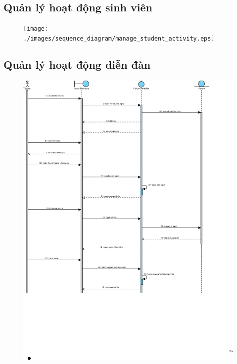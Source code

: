 \documentclass[./../main_file.tex]{subfiles}
\begin{document}
	\subsection{Quản lý hoạt động sinh viên }
	\begin{figure}[H]
		\centering
		\texttt{[image: ./images/sequence\_diagram/manage\_student\_activity.eps]}
	\end{figure}
	
	\subsection{Quản lý hoạt động diễn đàn}
	\begin{figure}[H]
		\centering
		\includegraphics[width=\linewidth]{./images/sequence_diagram/3_12_manage_forum.eps}
	\end{figure}
	
\end{document}
